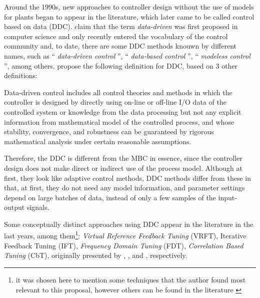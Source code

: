 Around the 1990s, new approaches to controller design without the use of models for plants began to appear in the literature, which later came to be called control based on data (DDC).
%
\cite{hou2013} claim that the term \emph{data-driven} was first proposed in computer science and only recently entered the vocabulary of the control community and, to date, there are some DDC methods knouwn by different names, such as `` \emph{data-driven control} '', `` \emph{data-based control} '', `` \emph{modeless control} '', among others. \cite{hou2013} propose the following definition for DDC, based on 3 other definitions:


\begin{defn}\citep{hou2013}
Data-driven control includes all control theories and methods in which the controller is designed by directly using on-line or off-line I/O data of the controlled system or knowledge from the data processing but not any explicit information from mathematical model of the controlled process, and whose stability, convergence, and robustness can be guaranteed by rigorous mathematical analysis under certain reasonable assumptions.
\end{defn}

Therefore, the DDC is different from the MBC in essence, since the controller design does not make direct or indirect use of the process model.  
Although at first, they look like adaptive control methods, DDC methods differ from these in that, at first, they do not need any model information, and parameter settings depend on large batches of data, instead of only a few samples of the input-output signals. %



Some conceptually distinct approaches using DDC appear in the literature in the last years, among them\footnote{it was chosen here to mention some techniques that the author found most relevant to this proposal, however others can be found in the literature \citep{spall1992, safonov1995, karimi2007, huang2008, schaal1994, shi2000}}:
\emph{Virtual Reference Feedback Tuning} (VRFT), Iterative Feedback Tuning (IFT), \emph{Frequency Domain Tuning} (FDT), \emph{Correlation Based Tuning} (CbT), originally presented by \cite{campi2002}, \cite{hjalmarsson1994}, \cite{kammer2000} and \cite{karimi2002}, respectively.

